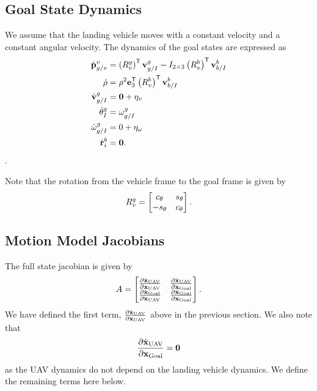 \subsection{Goal State Dynamics}
We assume that the landing vehicle moves with a constant velocity and a constant
angular velocity. The dynamics of the goal states are expressed as
\begin{align}
  \dot{\boldsymbol{\mathrm{p}}}_{g/v}^{v} &= \left(R_{v}^{g}\right)^{\mathsf{T}}
  \boldsymbol{\mathrm{v}}_{g/I}^{g} - I_{2 \times 3}\left(R_{v}^{b}\right)^{\mathsf{T}} \boldsymbol{\mathrm{v}}_{b/I}^{b} \\
  \dot{\rho} &= \rho^{2} \boldsymbol{\mathrm{e}}_{3}^{\mathsf{T}} \left(R_{v}^{b}\right)^{\mathsf{T}} \boldsymbol{\mathrm{v}}_{b/I}^{b} \\
  \dot{\boldsymbol{\mathrm{v}}}_{g/I}^{g} &= \boldsymbol{\mathrm{0}} + \eta_{v} \\
  \dot{\theta}_{I}^{g} &= \omega_{g/I}^g \\
  \dot{\omega}_{g/I}^{g} &= 0 + \eta_{\omega} \\
  \dot{\boldsymbol{\mathrm{r}}}_{i}^{b} &= \boldsymbol{\mathrm{0}}.
\end{align}.

Note that the rotation from the vehicle frame to the goal frame is given by
\begin{equation}
  R_v^g =
  \begin{bmatrix}
    c_\theta & s_\theta \\
    -s_\theta & c_\theta
  \end{bmatrix}.
\end{equation}

\subsection{Motion Model Jacobians}
The full state jacobian is given by
\begin{equation}
  A =
  \begin{bmatrix}
    \frac{\partial \dot{\boldsymbol{\mathrm{x}}}_{\text{UAV}}}{\partial \boldsymbol{\mathrm{x}}_{\text{UAV}}} &
    \frac{\partial \dot{\boldsymbol{\mathrm{x}}}_{\text{UAV}}}{\partial \boldsymbol{\mathrm{x}}_{\text{Goal}}} \\
    \frac{\partial \dot{\boldsymbol{\mathrm{x}}}_{\text{Goal}}}{\partial \boldsymbol{\mathrm{x}}_{\text{UAV}}} &
    \frac{\partial \dot{\boldsymbol{\mathrm{x}}}_{\text{Goal}}}{\partial \boldsymbol{\mathrm{x}}_{\text{Goal}}} 
  \end{bmatrix}.
\end{equation}
We have defined the first term, $\frac{\partial \dot{\boldsymbol{\mathrm{x}}}_{\text{UAV}}}{\partial
\boldsymbol{\mathrm{x}}_{\text{UAV}}}$ above in the previous section. We also note that
\begin{equation}
  \frac{\partial \dot{\boldsymbol{\mathrm{x}}}_{\text{UAV}}}{\partial \boldsymbol{\mathrm{x}}_{\text{Goal}}} = \boldsymbol{\mathrm{0}}
\end{equation}
as the UAV dynamics do not depend on the landing vehicle dynamics. We define the
remaining terms here below.

